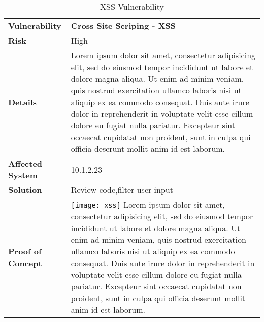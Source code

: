 \documentclass[10pt,a4paper]{article}
\newcommand{\toprow}{\rowcolor{lightgray}}
\begin{document}
\begin{table}[h!]
  \centering
    \begin{tabularx}{\linewidth}{>{\bfseries}lX}
    \toprow Vulnerability   & \bfseries Cross Site Scriping - XSS\\
    Risk            & High \\
    Details         & Lorem ipsum dolor sit amet, consectetur adipisicing elit, sed do eiusmod tempor incididunt ut labore et dolore magna aliqua. Ut enim ad minim veniam, quis nostrud exercitation ullamco laboris nisi ut aliquip ex ea commodo consequat. Duis aute irure dolor in reprehenderit in voluptate velit esse cillum dolore eu fugiat nulla pariatur. Excepteur sint occaecat cupidatat non proident, sunt in culpa qui officia deserunt mollit anim id est laborum. \\
    Affected System & 10.1.2.23 \\
    Solution        & Review code,filter user input \\
    Proof of Concept & \vspace{-.6em}\texttt{[image: xss]} Lorem ipsum dolor sit amet, consectetur adipisicing elit, sed do eiusmod tempor incididunt ut labore et dolore magna aliqua. Ut enim ad minim veniam, quis nostrud exercitation ullamco laboris nisi ut aliquip ex ea commodo consequat. Duis aute irure dolor in reprehenderit in voluptate velit esse cillum dolore eu fugiat nulla pariatur. Excepteur sint occaecat cupidatat non proident, sunt in culpa qui officia deserunt mollit anim id est laborum.  \\
    \end{tabularx}
    \caption{XSS Vulnerability}
  \label{tab:xss}
\end{table}
\end{document}
